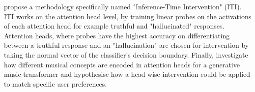 \citet{li2024inference} propose a methodology specifically named "Inference-Time Intervention" (ITI). ITI works on the attention head level, by training linear probes on the activations of each attention head for example truthful and "hallucinated" responses. Attention heads, where probes have the highest accuracy on differentiating between a truthful response and an "hallucination" are chosen for intervention by taking the normal vector of the classifier's decision boundary. Finally, \citet{Koo2024apr} investigate how different musical concepts are encoded in attention heads for a generative music transformer and hypothesise how a head-wise intervention could be applied to match specific user preferences.



